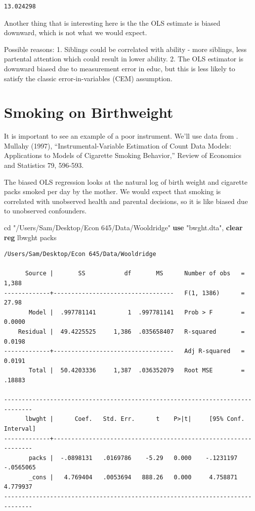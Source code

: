 \documentclass[
]{book}
\newenvironment{Shaded}{\begin{snugshade}}{\end{snugshade}}
\newcommand{\KeywordTok}[1]{\textcolor[rgb]{0.13,0.29,0.53}{\textbf{#1}}}
\newcommand{\NormalTok}[1]{#1}
\newcommand{\StringTok}[1]{\textcolor[rgb]{0.31,0.60,0.02}{#1}}
\begin{document}
\begin{verbatim}
13.024298
\end{verbatim}

Another thing that is interesting here is the the OLS estimate is biased downward, which is not what we would expect.

Possible reasons:
1. Siblings could be correlated with ability - more siblings, less partental attention which could result in lower ability.
2. The OLS estimator is downward biased due to measurement error in educ, but this is less likely to satisfy the classic error-in-variables (CEM) assumption.

\section{Smoking on Birthweight}\label{smoking-on-birthweight}

It is important to see an example of a poor instrument. We'll use data from . Mullahy (1997), ``Instrumental-Variable Estimation of Count Data Models: Applications to Models of Cigarette Smoking Behavior,'' Review of Economics and Statistics 79, 596-593.

The biased OLS regression looks at the natural log of birth weight and cigarette packs smoked per day by the mother. We would expect that smoking is correlated with unobserved health and parental decisions, so it is like biased due to unobserved confounders.

\begin{Shaded}
\begin{Highlighting}[]
\NormalTok{cd }\StringTok{"/Users/Sam/Desktop/Econ 645/Data/Wooldridge"}
\KeywordTok{use} \StringTok{"bwght.dta"}\NormalTok{, }\KeywordTok{clear}
\KeywordTok{reg}\NormalTok{ lbwght packs}
\end{Highlighting}
\end{Shaded}

\begin{verbatim}
/Users/Sam/Desktop/Econ 645/Data/Wooldridge

      Source |       SS           df       MS      Number of obs   =     1,388
-------------+----------------------------------   F(1, 1386)      =     27.98
       Model |  .997781141         1  .997781141   Prob > F        =    0.0000
    Residual |  49.4225525     1,386  .035658407   R-squared       =    0.0198
-------------+----------------------------------   Adj R-squared   =    0.0191
       Total |  50.4203336     1,387  .036352079   Root MSE        =    .18883

------------------------------------------------------------------------------
      lbwght |      Coef.   Std. Err.      t    P>|t|     [95% Conf. Interval]
-------------+----------------------------------------------------------------
       packs |  -.0898131   .0169786    -5.29   0.000    -.1231197   -.0565065
       _cons |   4.769404   .0053694   888.26   0.000     4.758871    4.779937
------------------------------------------------------------------------------
\end{verbatim}
\end{document}
